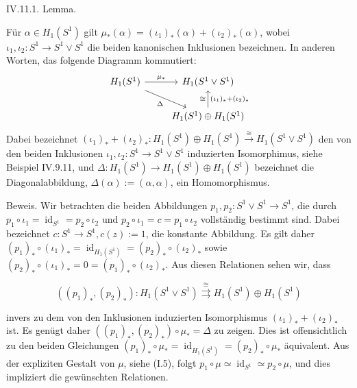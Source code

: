 \documentclass[10pt, letterpaper]{article}
\begin{document}
IV.11.1. Lemma. 

Für $\alpha \in H_1\left(S^1\right)$ gilt $\mu_*(\alpha)=\left(\iota_1\right)_*(\alpha)+\left(\iota_2\right)_*(\alpha)$, wobei $\iota_1, \iota_2: S^1 \rightarrow S^1 \vee S^1$ die beiden kanonischen Inklusionen bezeichnen. In anderen Worten, das folgende Diagramm kommutiert:
\[
\begin{tikzcd}
H_1(S^1) \arrow[r, "\mu_*"] \arrow[dr, "\Delta"'] & H_1(S^1 \vee S^1) \\
& H_1(S^1) \oplus H_1(S^1) \arrow[u, "(\iota_1)_* + (\iota_2)_*"', "\cong"]
\end{tikzcd}
\]
Dabei bezeichnet $\left(\iota_1\right)_*+\left(\iota_2\right)_*: H_1\left(S^1\right) \oplus H_1\left(S^1\right) \stackrel{\cong}{\rightarrow} H_1\left(S^1 \vee S^1\right)$ den von den beiden Inklusionen $\iota_1, \iota_2: S^1 \rightarrow S^1 \vee S^1$ induzierten Isomorphimus, siehe Beispiel IV.9.11, und $\Delta: H_1\left(S^1\right) \rightarrow H_1\left(S^1\right) \oplus H_1\left(S^1\right)$ bezeichnet die Diagonalabbildung, $\Delta(\alpha):=(\alpha, \alpha)$, ein Homomorphismus.



Beweis. Wir betrachten die beiden Abbildungen $p_1, p_2: S^1 \vee S^1 \rightarrow S^1$, die durch $p_1 \circ \iota_1=\operatorname{id}_{S^1}=p_2 \circ \iota_2$ und $p_2 \circ \iota_1=c=p_1 \circ \iota_2$ vollständig bestimmt sind. Dabei bezeichnet $c: S^1 \rightarrow S^1, c(z):=1$, die konstante Abbildung. Es gilt daher $\left(p_1\right)_* \circ\left(\iota_1\right)_*=\operatorname{id}_{H_1\left(S^1\right)}=\left(p_2\right)_* \circ\left(\iota_2\right)_*$ sowie $\left(p_2\right)_* \circ\left(\iota_1\right)_*=0=\left(p_1\right)_* \circ\left(\iota_2\right)_*$. Aus diesen Relationen sehen wir, dass

$$
\left(\left(p_1\right)_*,\left(p_2\right)_*\right): H_1\left(S^1 \vee S^1\right) \stackrel{\cong}{\rightrightarrows} H_1\left(S^1\right) \oplus H_1\left(S^1\right)
$$

invers zu dem von den Inklusionen induzierten Isomorphismus $\left(\iota_1\right)_*+\left(\iota_2\right)_*$ ist. Es genügt daher $\left(\left(p_1\right)_*,\left(p_2\right)_*\right) \circ \mu_*=\Delta$ zu zeigen. Dies ist offensichtlich zu den beiden Gleichungen $\left(p_1\right)_* \circ \mu_*=\operatorname{id}_{H_1\left(S^1\right)}=\left(p_2\right)_* \circ \mu_*$ äquivalent. Aus der expliziten Gestalt von $\mu$, siehe (I.5), folgt $p_1 \circ \mu \simeq \operatorname{id}_{S^1} \simeq p_2 \circ \mu$, und dies impliziert die gewünschten Relationen.
\end{document}
